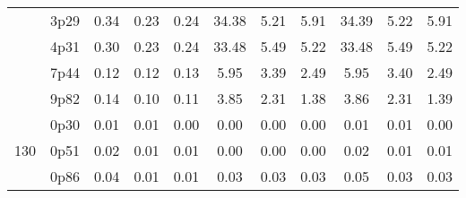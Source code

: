 \documentclass[12pt,A4paper]{article}
\begin{document}
\begin{table}[]
\begin{tabular}{lllllllllll}
\multicolumn{1}{|l|}{} & \multicolumn{1}{l|}{3p29} & \multicolumn{1}{c|}{0.34}        & \multicolumn{1}{c|}{0.23}         & \multicolumn{1}{c|}{0.24}        & \multicolumn{1}{c|}{34.38}         & \multicolumn{1}{c|}{5.21}        & \multicolumn{1}{c|}{5.91}        & \multicolumn{1}{c|}{34.39}        & \multicolumn{1}{c|}{5.22}        & \multicolumn{1}{c|}{5.91}         \\ \cline{2-11}
\multicolumn{1}{|l|}{} & \multicolumn{1}{l|}{4p31} & \multicolumn{1}{c|}{0.30}        & \multicolumn{1}{c|}{0.23}         & \multicolumn{1}{c|}{0.24}        & \multicolumn{1}{c|}{33.48}         & \multicolumn{1}{c|}{5.49}        & \multicolumn{1}{c|}{5.22}        & \multicolumn{1}{c|}{33.48}        & \multicolumn{1}{c|}{5.49}        & \multicolumn{1}{c|}{5.22}         \\ \cline{2-11}
\multicolumn{1}{|l|}{} & \multicolumn{1}{l|}{7p44} & \multicolumn{1}{c|}{0.12}        & \multicolumn{1}{c|}{0.12}         & \multicolumn{1}{c|}{0.13}        & \multicolumn{1}{c|}{5.95}         & \multicolumn{1}{c|}{3.39}        & \multicolumn{1}{c|}{2.49}        & \multicolumn{1}{c|}{5.95}        & \multicolumn{1}{c|}{3.40}        & \multicolumn{1}{c|}{2.49}         \\ \cline{2-11}
\multicolumn{1}{|l|}{} & \multicolumn{1}{l|}{9p82} & \multicolumn{1}{c|}{0.14}        & \multicolumn{1}{c|}{0.10}         & \multicolumn{1}{c|}{0.11}        & \multicolumn{1}{c|}{3.85}         & \multicolumn{1}{c|}{2.31}        & \multicolumn{1}{c|}{1.38}        & \multicolumn{1}{c|}{3.86}        & \multicolumn{1}{c|}{2.31}        & \multicolumn{1}{c|}{1.39}         \\ \hline
\multicolumn{1}{|l|}{\multirow{11}{*}{130}} & \multicolumn{1}{l|}{0p30} & \multicolumn{1}{c|}{0.01}        & \multicolumn{1}{c|}{0.01}         & \multicolumn{1}{c|}{0.00}        & \multicolumn{1}{c|}{0.00}         & \multicolumn{1}{c|}{0.00}        & \multicolumn{1}{c|}{0.00}         & \multicolumn{1}{c|}{0.01}         & \multicolumn{1}{c|}{0.01}         & \multicolumn{1}{c|}{0.00}         \\ \cline{2-11} 
\multicolumn{1}{|l|}{} & \multicolumn{1}{l|}{0p51} & \multicolumn{1}{c|}{0.02}        & \multicolumn{1}{c|}{0.01}         & \multicolumn{1}{c|}{0.01}        & \multicolumn{1}{c|}{0.00}         & \multicolumn{1}{c|}{0.00}        & \multicolumn{1}{c|}{0.00}        & \multicolumn{1}{c|}{0.02}        & \multicolumn{1}{c|}{0.01}        & \multicolumn{1}{c|}{0.01}         \\ \cline{2-11}
\multicolumn{1}{|l|}{} & \multicolumn{1}{l|}{0p86} & \multicolumn{1}{c|}{0.04}        & \multicolumn{1}{c|}{0.01}         & \multicolumn{1}{c|}{0.01}        & \multicolumn{1}{c|}{0.03}         & \multicolumn{1}{c|}{0.03}        & \multicolumn{1}{c|}{0.03}        & \multicolumn{1}{c|}{0.05}        & \multicolumn{1}{c|}{0.03}        & \multicolumn{1}{c|}{0.03}         \\ \cline{2-11}

\end{tabular}
\end{table}
\end{document}

